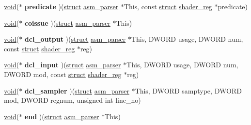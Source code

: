 \begin{DoxyCompactItemize}
\item 
\mbox{\label{structasmparser__backend_a0e2623b52d2deafe43a24182c050550d}} 
\hyperlink{interfacevoid}{void}($\ast$ {\bfseries predicate} )(\hyperlink{interfacestruct}{struct} \hyperlink{structasm__parser}{asm\+\_\+parser} $\ast$This, const \hyperlink{interfacestruct}{struct} \hyperlink{structshader__reg}{shader\+\_\+reg} $\ast$predicate)
\item 
\mbox{\label{structasmparser__backend_aecb71e0f7ba23f3f2390e70ccf6f71b2}} 
\hyperlink{interfacevoid}{void}($\ast$ {\bfseries coissue} )(\hyperlink{interfacestruct}{struct} \hyperlink{structasm__parser}{asm\+\_\+parser} $\ast$This)
\item 
\mbox{\label{structasmparser__backend_ad8508bf57213f6622af933d306e1dbdc}} 
\hyperlink{interfacevoid}{void}($\ast$ {\bfseries dcl\+\_\+output} )(\hyperlink{interfacestruct}{struct} \hyperlink{structasm__parser}{asm\+\_\+parser} $\ast$This, D\+W\+O\+RD usage, D\+W\+O\+RD num, const \hyperlink{interfacestruct}{struct} \hyperlink{structshader__reg}{shader\+\_\+reg} $\ast$reg)
\item 
\mbox{\label{structasmparser__backend_ad57e9428ad94067be7d124918bb66b3b}} 
\hyperlink{interfacevoid}{void}($\ast$ {\bfseries dcl\+\_\+input} )(\hyperlink{interfacestruct}{struct} \hyperlink{structasm__parser}{asm\+\_\+parser} $\ast$This, D\+W\+O\+RD usage, D\+W\+O\+RD num, D\+W\+O\+RD mod, const \hyperlink{interfacestruct}{struct} \hyperlink{structshader__reg}{shader\+\_\+reg} $\ast$reg)
\item 
\mbox{\label{structasmparser__backend_adc205dceaaeaf187405f96f8c2b52a95}} 
\hyperlink{interfacevoid}{void}($\ast$ {\bfseries dcl\+\_\+sampler} )(\hyperlink{interfacestruct}{struct} \hyperlink{structasm__parser}{asm\+\_\+parser} $\ast$This, D\+W\+O\+RD samptype, D\+W\+O\+RD mod, D\+W\+O\+RD regnum, unsigned int line\+\_\+no)
\item 
\mbox{\label{structasmparser__backend_a83ae8d35a539d45bc7d17f0fad0fe88f}} 
\hyperlink{interfacevoid}{void}($\ast$ {\bfseries end} )(\hyperlink{interfacestruct}{struct} \hyperlink{structasm__parser}{asm\+\_\+parser} $\ast$This)

\end{DoxyCompactItemize}
